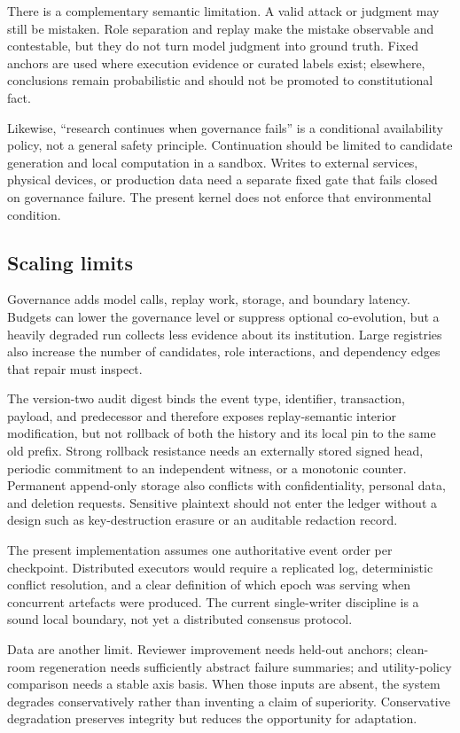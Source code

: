 There is a complementary semantic limitation. A valid attack or judgment
may still be mistaken. Role separation and replay make the mistake
observable and contestable, but they do not turn model judgment into
ground truth. Fixed anchors are used where execution evidence or curated
labels exist; elsewhere, conclusions remain probabilistic and should not
be promoted to constitutional fact.

Likewise, ``research continues when governance fails'' is a conditional
availability policy, not a general safety principle. Continuation should
be limited to candidate generation and local computation in a sandbox.
Writes to external services, physical devices, or production data need a
separate fixed gate that fails closed on governance failure. The present
kernel does not enforce that environmental condition.

\subsection{Scaling limits}\label{sec:discussion:scaling}

Governance adds model calls, replay work, storage, and boundary latency.
Budgets can lower the governance level or suppress optional co-evolution,
but a heavily degraded run collects less evidence about its institution.
Large registries also increase the number of candidates, role interactions,
and dependency edges that repair must inspect.

The version-two audit digest binds the event type, identifier, transaction,
payload, and predecessor and therefore exposes replay-semantic interior
modification, but not rollback of
both the history and its local pin to the same old prefix. Strong rollback
resistance needs an externally stored signed head, periodic commitment to
an independent witness, or a monotonic counter. Permanent append-only
storage also conflicts with confidentiality, personal data, and deletion
requests. Sensitive plaintext should not enter the ledger without a
design such as key-destruction erasure or an auditable redaction record.

The present implementation assumes one authoritative event order per
checkpoint. Distributed executors would require a replicated log,
deterministic conflict resolution, and a clear definition of which epoch
was serving when concurrent artefacts were produced. The current
single-writer discipline is a sound local boundary, not yet a distributed
consensus protocol.

Data are another limit. Reviewer improvement needs held-out anchors;
clean-room regeneration needs sufficiently abstract failure summaries;
and utility-policy comparison needs a stable axis basis. When those inputs
are absent, the system degrades conservatively rather than inventing a
claim of superiority. Conservative degradation preserves integrity but
reduces the opportunity for adaptation.

